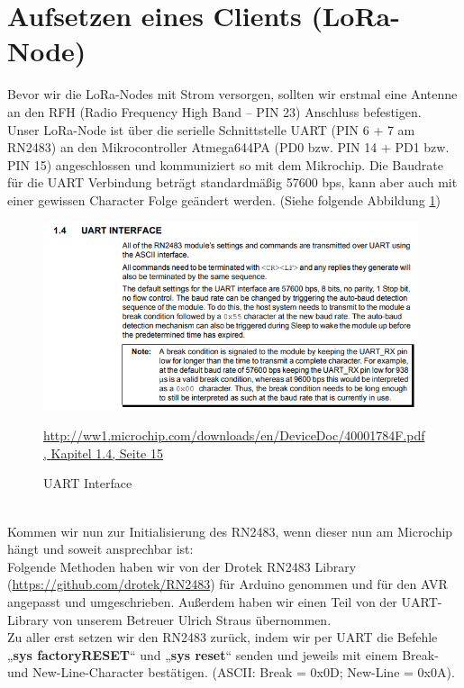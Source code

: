 \section{Aufsetzen eines Clients (LoRa-Node)} \label{mac-commands}
Bevor wir die LoRa-Nodes mit Strom versorgen, sollten wir erstmal eine Antenne an den RFH (Radio Frequency High Band – PIN 23) Anschluss befestigen.\\
Unser LoRa-Node ist über die serielle Schnittstelle UART (PIN 6 + 7 am RN2483) an den Mikrocontroller Atmega644PA (PD0 bzw. PIN 14 + PD1 bzw. PIN 15) angeschlossen und kommuniziert so mit dem Mikrochip. Die Baudrate für die UART Verbindung beträgt standardmäßig 57600 bps, kann aber auch mit einer gewissen Character Folge geändert werden. (Siehe folgende Abbildung \ref{fig:UART})
\begin{figure}[ht]
    \center
    \includegraphics[width=11cm]{Bilder/lora-8.png}\\
    \caption{UART Interface}
    \begin{center} \quelle\url{http://ww1.microchip.com/downloads/en/DeviceDoc/40001784F.pdf,  Kapitel 1.4, Seite 15} \end{center}
        \label{fig:UART}
\end{figure}\\
Kommen wir nun zur Initialisierung des RN2483, wenn dieser nun am Microchip hängt und soweit ansprechbar ist:\\

Folgende Methoden haben wir von der Drotek RN2483 Library (\url{https://github.com/drotek/RN2483}) für Arduino genommen und für den AVR angepasst und umgeschrieben. Außerdem haben wir einen Teil von der UART-Library von unserem Betreuer Ulrich Straus übernommen.\\

Zu aller erst setzen wir den RN2483 zurück, indem wir per UART die Befehle „\textbf{sys factoryRESET}“ und „\textbf{sys reset}“ senden und jeweils mit einem Break- und New-Line-Character bestätigen. (ASCII: Break = 0x0D; New-Line = 0x0A).\\

